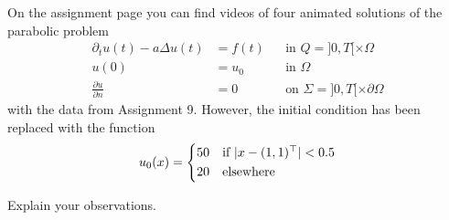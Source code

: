 On the assignment page you can find videos of four animated solutions of the parabolic problem
\begin{equation}\tag{H}\label{eq:heat}
\begin{aligned}
\partial_t u(t) - a \Delta u(t) &= f(t) && \text{in } Q = ]0,T[ \times \Omega\\
u(0) &= u_0 && \text{in } \Omega\\
\frac{\partial u}{\partial n} &= 0 && \text{on } \Sigma = ]0,T[ \times \partial \Omega
\end{aligned}
\end{equation}
with the data from Assignment 9. However, the initial condition has been replaced with the function
\begin{equation*}
u_0(x) =
\begin{dcases*}
50 & if $\lvert x - (1,1)^\top \rvert < 0.5$\\
20 & elsewhere
\end{dcases*}
\end{equation*}

Explain your observations.

